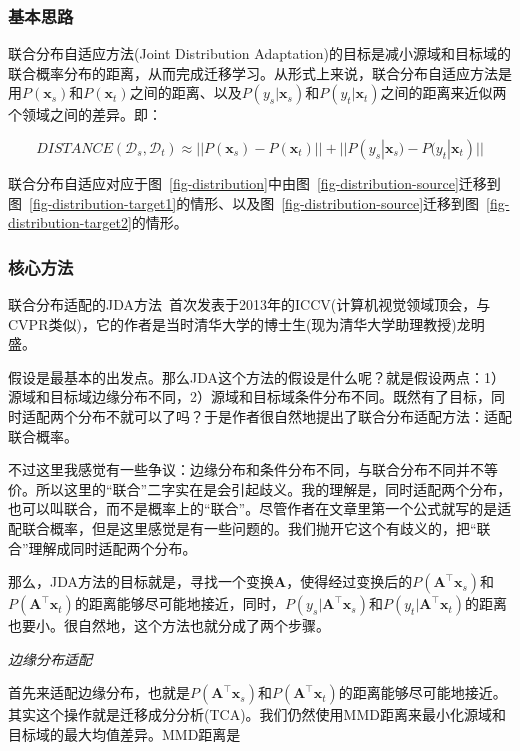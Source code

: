 \subsubsection{基本思路}

联合分布自适应方法(Joint Distribution Adaptation)的目标是减小源域和目标域的联合概率分布的距离，从而完成迁移学习。从形式上来说，联合分布自适应方法是用$P(\mathbf{x}_s)$和$P(\mathbf{x}_t)$之间的距离、以及$P(y_s|\mathbf{x}_s)$和$P(y_t|\mathbf{x}_t)$之间的距离来近似两个领域之间的差异。即：

\begin{equation}
\label{eq-joint-general}
DISTANCE(\mathcal{D}_s,\mathcal{D}_t) \approx ||P(\mathbf{x}_s) - P(\mathbf{x}_t)|| + ||P(y_s|\mathbf{x}_s) - P(y_t|\mathbf{x}_t)||
\end{equation}

联合分布自适应对应于图~\ref{fig-distribution}中由图~\ref{fig-distribution-source}迁移到图~\ref{fig-distribution-target1}的情形、以及图~\ref{fig-distribution-source}迁移到图~\ref{fig-distribution-target2}的情形。

\subsubsection{核心方法}

联合分布适配的JDA方法~\cite{long2013transfer}首次发表于2013年的ICCV(计算机视觉领域顶会，与CVPR类似)，它的作者是当时清华大学的博士生(现为清华大学助理教授)龙明盛。

假设是最基本的出发点。那么JDA这个方法的假设是什么呢？就是假设两点：1）源域和目标域边缘分布不同，2）源域和目标域条件分布不同。既然有了目标，同时适配两个分布不就可以了吗？于是作者很自然地提出了联合分布适配方法：适配联合概率。

不过这里我感觉有一些争议：边缘分布和条件分布不同，与联合分布不同并不等价。所以这里的“联合”二字实在是会引起歧义。我的理解是，同时适配两个分布，也可以叫联合，而不是概率上的“联合”。尽管作者在文章里第一个公式就写的是适配联合概率，但是这里感觉是有一些问题的。我们抛开它这个有歧义的，把“联合”理解成同时适配两个分布。

那么，JDA方法的目标就是，寻找一个变换$\mathbf{A}$，使得经过变换后的$P(\mathbf{A}^\top \mathbf{x}_s)$和$P(\mathbf{A}^\top \mathbf{x}_t)$的距离能够尽可能地接近，同时，$P(y_s|\mathbf{A}^\top \mathbf{x}_s)$和$P(y_t|\mathbf{A}^\top \mathbf{x}_t)$的距离也要小。很自然地，这个方法也就分成了两个步骤。

\textit{边缘分布适配}

首先来适配边缘分布，也就是$P(\mathbf{A}^\top \mathbf{x}_s)$和$P(\mathbf{A}^\top \mathbf{x}_t)$的距离能够尽可能地接近。其实这个操作就是迁移成分分析(TCA)。我们仍然使用MMD距离来最小化源域和目标域的最大均值差异。MMD距离是

